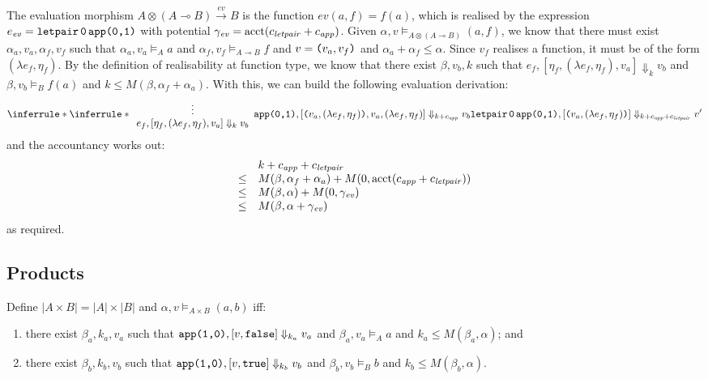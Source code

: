 \documentclass{workingnote}
\newcommand{\account}{\mathrm{acct}}
\begin{document}
The evaluation morphism
$A \otimes (A \multimap B) \stackrel{\mathit{ev}}\longrightarrow B$ is
the function $\mathit{ev}(a,f) = f(a)$, which is realised by the
expression
$e_{\mathit{ev}} = \texttt{letpair}\,\texttt{0}\,\texttt{app(}\texttt{0}\texttt{,}\texttt{1}\texttt{)}$ with
potential $\gamma_{\mathit{ev}} = \account(\cnstLetPair +
\cnstApp)$. Given
$\alpha, v \models_{A \otimes (A \multimap B)} (a,f)$, we know that
there must exist $\alpha_a,v_a,\alpha_f,v_f$ such that
$\alpha_a, v_a \models_A a$ and
$\alpha_f, v_f \models_{A \multimap B} f$ and $v = \texttt{(}v_a,v_f\texttt{)}$ and
$\alpha_a+\alpha_f \leq \alpha$. Since $v_f$ realises a function, it
must be of the form $(\lambda e_f, \eta_f)$. By the definition of
realisability at function type, we know that there exist
$\beta, v_b, k$ such that
$e_f, [\eta_f, (\lambda e_f, \eta_f), v_a] \Downarrow_k v_b$ and
$\beta, v_b \models_B f(a)$ and
$k \leq M(\beta, \alpha_f + \alpha_a)$. With this, we can build the
following evaluation derivation:
\begin{displaymath}
  \inferrule*
  {\inferrule*
    { {\begin{array}{c} \vdots \\
         e_f, [\eta_f, (\lambda e_f, \eta_f), v_a] \Downarrow_k v_b
       \end{array}}}
   {\Apply{\Idx{0}}{\Idx{1}}, [\Pair{v_a,(\lambda e_f, \eta_f)}, v_a, (\lambda e_f, \eta_f)] \Downarrow_{k + \cnstApp} v_b}}
  {\LetPair\,\Idx{0}\,\Apply{\Idx{0}}{\Idx{1}}, [\Pair{v_a,(\lambda e_f, \eta_f)}] \Downarrow_{k + \cnstApp + \cnstLetPair} v'}
\end{displaymath}
and the accountancy works out:
\begin{displaymath}
  \begin{array}{cl}
    &k + \cnstApp + \cnstLetPair \\
    \leq&M(\beta, \alpha_f + \alpha_a) + M(0,\account(\cnstApp + \cnstLetPair)) \\
    \leq&M(\beta, \alpha) + M(0,\gamma_{\mathit{ev}}) \\
    \leq&M(\beta, \alpha + \gamma_{\mathit{ev}})
  \end{array}
\end{displaymath}
as required.

\subsection{Products}

Define $|A \times B| = |A| \times |B|$ and
$\alpha, v \models_{A \times B} (a,b)$ iff:
\begin{enumerate}
\item there exist $\beta_a, k_a, v_a$ such that
  $\texttt{app(}\texttt{1}\texttt{,}\texttt{0}\texttt{)},[v,\texttt{false}] \Downarrow_{k_a} v_a$ and
  $\beta_a, v_a \models_A a$ and $k_a \leq M(\beta_a, \alpha)$; and
\item there exist $\beta_b, k_b, v_b$ such that
  $\texttt{app(}\texttt{1}\texttt{,}\texttt{0}\texttt{)},[v,\texttt{true}] \Downarrow_{k_b} v_b$ and
  $\beta_b, v_b \models_B b$ and $k_b \leq M(\beta_b, \alpha)$.
\end{enumerate}
\end{document}
